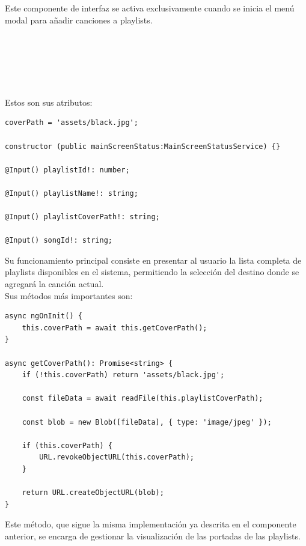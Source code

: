 \documentclass[11pt, a4paper]{article}
\begin{document}
                Este componente de interfaz se activa exclusivamente cuando se inicia el menú modal para añadir canciones a playlists. \\ \\ \\ \\ \\ \\ \\

                Estos son sus atributos:

                \begin{lstlisting}[caption={Atributos Playlist Button}]
coverPath = 'assets/black.jpg';

constructor (public mainScreenStatus:MainScreenStatusService) {}

@Input() playlistId!: number;

@Input() playlistName!: string;

@Input() playlistCoverPath!: string;

@Input() songId!: string;
                \end{lstlisting}

                Su funcionamiento principal consiste en presentar al usuario la lista completa de playlists disponibles en el sistema, permitiendo la selección del destino donde se agregará la canción actual. \\

                Sus métodos más importantes son:

                \begin{lstlisting}[caption={getCoverPath()}]
async ngOnInit() {
    this.coverPath = await this.getCoverPath();
}

async getCoverPath(): Promise<string> {
    if (!this.coverPath) return 'assets/black.jpg';

    const fileData = await readFile(this.playlistCoverPath);

    const blob = new Blob([fileData], { type: 'image/jpeg' });

    if (this.coverPath) {
        URL.revokeObjectURL(this.coverPath);
    }

    return URL.createObjectURL(blob);
}
                \end{lstlisting}

                Este método, que sigue la misma implementación ya descrita en el componente anterior, se encarga de gestionar la visualización de las portadas de las playlists.
\end{document}
